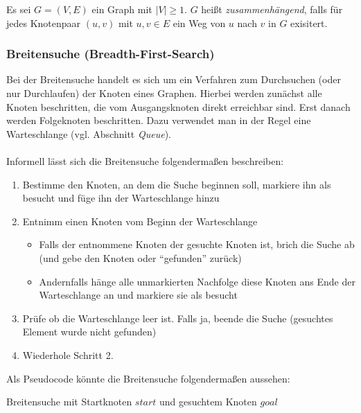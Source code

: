 \begin{defi}
	Es sei $G = (V,E)$ ein Graph mit $|V| \ge 1$. $G$ heißt \emph{zusammenhängend}, falls für jedes Knotenpaar $(u,v)$ mit $u,v \in E$ ein Weg von $u$ nach $v$ in $G$ exisitert.
\end{defi}

\subsubsection{Breitensuche (Breadth-First-Search)}
Bei der Breitensuche handelt es sich um ein Verfahren zum Durchsuchen (oder nur Durchlaufen) der Knoten eines Graphen. Hierbei werden zunächst alle Knoten beschritten, die vom Ausgangsknoten direkt erreichbar sind. Erst danach werden Folgeknoten beschritten. Dazu verwendet man in der Regel eine Warteschlange (vgl. Abschnitt \emph{Queue}). \\ \\
Informell lässt sich die Breitensuche folgendermaßen beschreiben:
\begin{enumerate}
	\item Bestimme den Knoten, an dem die Suche beginnen soll, markiere ihn als besucht und füge ihn der Warteschlange hinzu
	\item Entnimm einen Knoten vom Beginn der Warteschlange
	\begin{itemize}
		\item Falls der entnommene Knoten der gesuchte Knoten ist, brich die Suche ab (und gebe den Knoten oder ``gefunden'' zurück)
		\item Andernfalls hänge alle unmarkierten Nachfolge diese Knoten ans Ende der Warteschlange an und markiere sie als besucht
	\end{itemize}
	\item Prüfe ob die Warteschlange leer ist. Falls ja, beende die Suche (gesuchtes Element wurde nicht gefunden)
	\item Wiederhole Schritt 2.
\end{enumerate}
Als Pseudocode könnte die Breitensuche folgendermaßen aussehen:
\begin{algorithm}[H]
	\caption{Breitensuche mit Startknoten $start$ und gesuchtem Knoten $goal$}
	 \begin{algorithmic}
				 
				\EndFor

					\EndIf
						\EndIf
					\EndFor
				\EndWhile
		 \EndProcedure
	 \end{algorithmic}
\end{algorithm}

